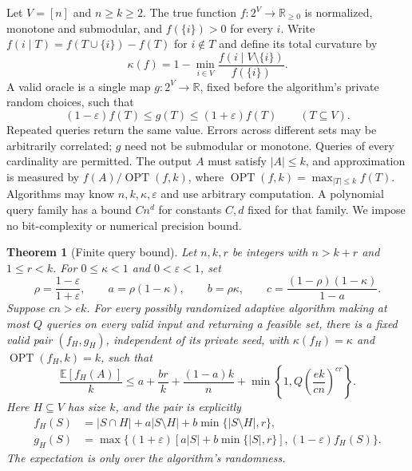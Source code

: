 \documentclass[manuscript,11pt,screen,nonacm]{acmart}
\newcommand{\E}{\mathbb E}
\newcommand{\OPT}{\operatorname{OPT}}
\newcommand{\eps}{\varepsilon}
\newtheorem{theorem}{Theorem}
\begin{document}
Let $V=[n]$ and $n\ge k\ge2$. The true function
$f:2^V\to\mathbb R_{\ge0}$ is normalized, monotone and submodular, and
$f(\{i\})>0$ for every $i$. Write
$f(i\mid T)=f(T\cup\{i\})-f(T)$ for $i\notin T$ and define its total curvature by
\[
 \kappa(f)=1-\min_{i\in V}
 \frac{f(i\mid V\setminus\{i\})}{f(\{i\})}.
\]
A valid oracle is a single map $g:2^V\to\mathbb R$, fixed before the
algorithm's private random choices, such that
\begin{equation}\label{eq:noise}
 (1-\eps)f(T)\le g(T)\le(1+\eps)f(T)\qquad(T\subseteq V).
\end{equation}
Repeated queries return the same value. Errors across different sets may
be arbitrarily correlated; $g$ need not be submodular or monotone.
Queries of every cardinality are permitted. The output $A$ must satisfy
$|A|\le k$, and approximation is measured by
$f(A)/\OPT(f,k)$, where $\OPT(f,k)=\max_{|T|\le k}f(T)$.
Algorithms may know $n,k,\kappa,\eps$ and use arbitrary computation.
A polynomial query family has a bound $C n^d$ for constants $C,d$ fixed
for that family. We impose no bit-complexity or numerical precision bound.

\begin{theorem}[Finite query bound]\label{thm:finite}
Let $n,k,r$ be integers with $n>k+r$ and $1\le r<k$. For
$0\le\kappa<1$ and $0<\eps<1$, set
\begin{equation}\label{eq:parameters}
 \rho=\frac{1-\eps}{1+\eps},\qquad
 a=\rho(1-\kappa),\qquad b=\rho\kappa,\qquad
 c=\frac{(1-\rho)(1-\kappa)}{1-a}.
\end{equation}
Suppose $cn>e k$. For every possibly randomized adaptive algorithm making
at most $Q$ queries on every valid input and returning a feasible set,
there is a fixed valid pair $(f_H,g_H)$, independent of its private seed,
with $\kappa(f_H)=\kappa$ and $\OPT(f_H,k)=k$, such that
\begin{equation}\label{eq:finite}
 \frac{\E[f_H(A)]}{k}
 \le a+\frac{br}{k}+\frac{(1-a)k}{n}
       +\min\left\{1,Q\left(\frac{e k}{cn}\right)^{cr}\right\}.
\end{equation}
Here $H\subseteq V$ has size $k$, and the pair is explicitly
\begin{align}
 f_H(S)&=|S\cap H|+a|S\setminus H|+b\min\{|S\setminus H|,r\},
                                                        \label{eq:family}\\
 g_H(S)&=\max\big\{(1+\eps)[a|S|+b\min\{|S|,r\}],
                         (1-\eps)f_H(S)\big\}.          \label{eq:oracle}
\end{align}
The expectation is only over the algorithm's randomness.
\end{theorem}
\end{document}
